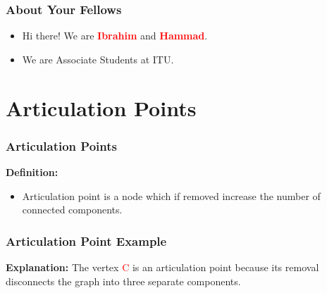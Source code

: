 \begin{frame}
    \frametitle{About Your Fellows}
    \begin{itemize}
        \item Hi there! We are \textcolor{red}{\textbf{Ibrahim}} {and }\textcolor{red}{\textbf{Hammad}}.
        \item We are Associate Students at ITU.
    \end{itemize}
\end{frame}

\section{\textbf{Articulation Points}}

\begin{frame}
    \frametitle{\textbf{Articulation Points}}
        \item\textbf{{Definition:}}
       \vspace{0.3cm}
        \begin{itemize}
            \item Articulation point is a node which if removed increase the number of connected components.
        \end{itemize}
\end{frame}
\begin{frame}
    \frametitle{\textbf{Articulation Point Example}}

    \begin{center}
    \end{center}

    \textbf{Explanation:} The vertex \textcolor{red}{C} is an articulation point because its removal disconnects the graph into three separate components.
\end{frame}

